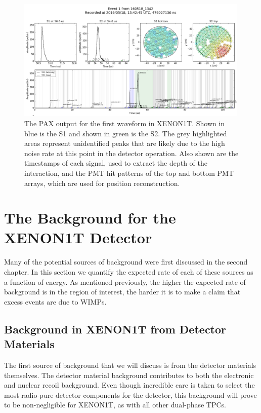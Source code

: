 \begin{figure}[t]
	\centering
	\includegraphics[width=0.99\textwidth]{xe1t_pax_output_first_waveform}
	\caption{The PAX output for the first waveform in XENON1T.  Shown in blue is the S1 and shown in green is the S2.  The grey highlighted areas represent unidentified peaks that are likely due to the high noise rate at this point in the detector operation.  Also shown are the timestamps of each signal, used to extract the depth of the interaction, and the PMT hit patterns of the top and bottom PMT arrays, which are used for position reconstruction.}
	\label{fig:xe1t_pax_output_first_waveform}
\end{figure}


\section{The Background for the XENON1T Detector}
\label{sec:xe1t_bkg}

Many of the potential sources of background were first discussed in the second chapter.  In this section we quantify the expected rate of each of these sources as a function of energy.  As mentioned previously, the higher the expected rate of background is in the region of interest, the harder it is to make a claim that excess events are due to WIMPs.  


\subsection{Background in XENON1T from Detector Materials}
\label{sec:xe1t_materials_bkg}

The first source of background that we will discuss is from the detector materials themselves.  The detector material background contributes to both the electronic and nuclear recoil background.  Even though incredible care is taken to select the most radio-pure detector components for the detector, this background will prove to be non-negligible for XENON1T, as with all other dual-phase TPCs.

